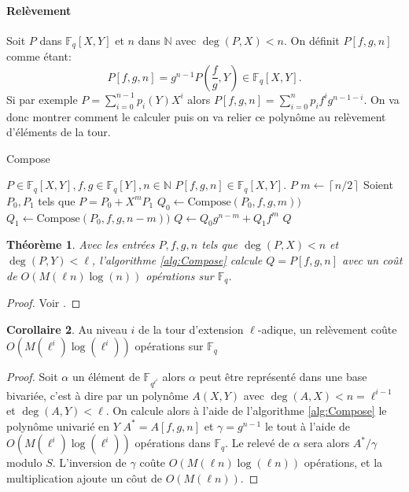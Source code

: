 \documentclass[10pt,a4paper]{book}
\theoremstyle{plain}
\newtheorem{thm}{Théorème}[chapter]
\theoremstyle{definition}
\theoremstyle{definition}
\newtheorem{cor}[thm]{Corollaire}
\theoremstyle{definition}
\theoremstyle{definition}
\theoremstyle{remark}
\theoremstyle{remark}
\theoremstyle{definition}
\begin{document}
\paragraph{Relèvement}
Soit $P$ dans $\mathbb{F}_q[X,Y]$ et $n$ dans $\mathbb{N}$ avec $\deg(P,X)<n$. On définit $P[f,g,n]$ comme étant:
\[
P[f,g,n]=g^{n-1}P(\frac{f}{g},Y)\in \mathbb{F}_q[X,Y].
\]
Si par exemple $P=\sum_{i=0}^{n-1}p_i(Y)X^i$ alors $P[f,g,n]=\sum_{i=0}^{n}p_if^ig^{n-1-i}$. On va donc montrer comment le calculer puis on va relier ce polynôme au relèvement d'éléments de la tour.

\begin{algorithm}
\caption{\label{alg:Compose}Compose}
\begin{algorithmic}[1]
\REQUIRE $P \in \mathbb{F}_q[X,Y], f,g \in \mathbb{F}_q[Y], n \in \mathbb{N}$
\ENSURE $P[f,g,n] \in \mathbb{F}_q[X,Y]$.
 \RETURN $P$
\ELSE
\STATE $m \gets \left\lceil n/2 \right\rceil   $
\STATE Soient $P_0,P_1$ tels que $P=P_0 + X^{m} P_1$
\STATE $Q_0 \gets \textrm{Compose}(P_0,f,g,m))$
\STATE $Q_1 \gets \textrm{Compose}(P_0,f,g,n-m))$
\STATE $Q \gets Q_0g^{n-m}+Q_1f^m$
\RETURN $Q$ 
\ENDIF
\end{algorithmic}
\end{algorithm}


\begin{thm}\label{thm:compose}
Avec les entrées $P,f,g,n$ tels que $\deg(P,X)<n$ et $\deg(P,Y)<\ell$, l'algorithme \ref{alg:Compose} calcule $Q=P[f,g,n]$ avec un coût de $O(M(\ell n)\log(n))$ opérations sur $\mathbb{F}_q$.
\end{thm}

\begin{proof}
Voir \cite{DeFeo-Doliskani-Schost13}.
\end{proof}

\begin{cor}
Au niveau $i$ de la tour d'extension $\ell$-adique, un relèvement coûte $O(M(\ell^i)\log(\ell^i))$ opérations sur $\mathbb{F}_q$
\end{cor}

\begin{proof}
Soit $\alpha$ un élément de $\mathbb{F}_{q^{\ell^i}}$ alors $\alpha$ peut être représenté dans une base bivariée, c'est à dire par un polynôme $A(X,Y)$ avec $\deg(A,X)<n=\ell^{i-1}$ et $\deg(A,Y)<\ell$. On calcule alors à l'aide de l'algorithme \ref{alg:Compose} le polynôme univarié en $Y$ $A^*=A[f,g,n]$ et $\gamma = g^{n-1}$ le tout à l'aide de $O(M(\ell^i)\log(\ell^i))$ opérations dans $\mathbb{F}_q$. Le relevé de $\alpha$ sera alors $A^*/\gamma$ modulo $S$. L'inversion de $\gamma$ coûte $O(M(\ell n)\log(\ell n))$ opérations, et la multiplication ajoute un côut de $O(M(\ell n))$.
\end{proof}
\end{document}
